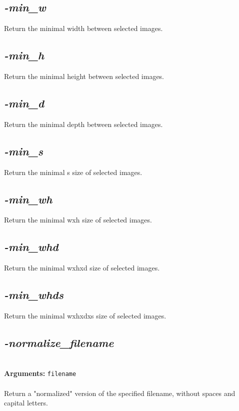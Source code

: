 \documentclass[a4paper,11pt,twoside]{book}
\begin{document}
\subsection{\emph{-min\_w} }\vspace*{-0.5em}
Return the minimal width between selected images.


\subsection{\emph{-min\_h} }\vspace*{-0.5em}
Return the minimal height between selected images.


\subsection{\emph{-min\_d} }\vspace*{-0.5em}
Return the minimal depth between selected images.


\subsection{\emph{-min\_s} }\vspace*{-0.5em}
Return the minimal s size of selected images.


\subsection{\emph{-min\_wh} }\vspace*{-0.5em}
Return the minimal wxh size of selected images.


\subsection{\emph{-min\_whd} }\vspace*{-0.5em}
Return the minimal wxhxd size of selected images.


\subsection{\emph{-min\_whds} }\vspace*{-0.5em}
Return the minimal wxhxdxs size of selected images.


\subsection{\emph{-normalize\_filename} }\vspace*{-0.5em}
~\\\textbf{Arguments: } 
{\small \texttt{filename}}\\~\\
Return a "normalized" version of the specified filename, without spaces and capital letters.
\end{document}
